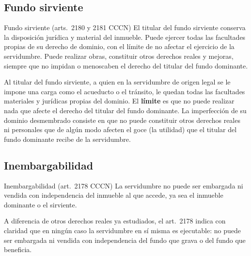 \documentclass[12pt,oneside]{book}
\begin{document}
\subsection{Fundo sirviente}

\begin{regla}{Fundo sirviente (arts.~2180 y 2181 CCCN)}
El titular del fundo sirviente conserva la disposición jurídica y material del inmueble. Puede ejercer todas las facultades propias de su derecho de dominio, con el límite de no afectar el ejercicio de la servidumbre. Puede realizar obras, constituir otros derechos reales y mejoras, siempre que no impidan o menoscaben el derecho del titular del fundo dominante.
\end{regla}

Al titular del fundo sirviente, a quien en la servidumbre de origen legal se le impone una carga como el acueducto o el tránsito, le quedan todas las facultades materiales y jurídicas propias del dominio. El \textbf{límite} es que no puede realizar nada que afecte el derecho del titular del fundo dominante. La imperfección de su dominio desmembrado consiste en que no puede constituir otros derechos reales ni personales que de algún modo afecten el goce (la utilidad) que el titular del fundo dominante recibe de la servidumbre.


\subsection{Inembargabilidad}

\begin{regla}{Inembargabilidad (art.~2178 CCCN)}
La servidumbre no puede ser embargada ni vendida con independencia del inmueble al que accede, ya sea el inmueble dominante o el sirviente.
\end{regla}

A diferencia de otros derechos reales ya estudiados, el art.~2178 indica con claridad que en ningún caso la servidumbre en sí misma es ejecutable: no puede ser embargada ni vendida con independencia del fundo que grava o del fundo que beneficia.
\end{document}
